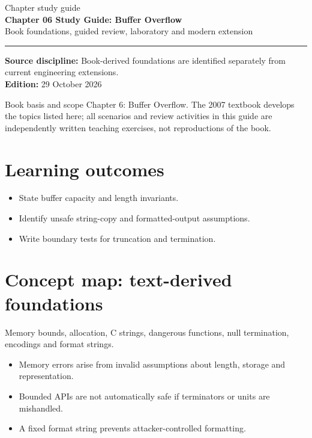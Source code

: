 \documentclass[10pt,letterpaper]{article}
\begin{document}
\hypersetup{pageanchor=false}%
\begin{titlepage}
\vspace*{1.0in}
{\color{bluegray}\Large Chapter study guide}\\[1.0em]
{\color{navy}\Huge\bfseries Chapter 06 Study Guide: Buffer Overflow}\\[0.7em]
{\Large Book foundations, guided review, laboratory and modern extension}\\[2.0em]
\rule{\linewidth}{1.0pt}
\vfill
\textbf{Source discipline:} Book-derived foundations are identified separately from current engineering extensions.\\
\textbf{Edition:} 29 October 2026
\end{titlepage}\hypersetup{pageanchor=true}
\tableofcontents
\clearpage
\begin{focusbox}{Book basis and scope}
Chapter 6: Buffer Overflow. The 2007 textbook develops the topics listed here; all scenarios and review activities in this guide are independently written teaching exercises, not reproductions of the book.\end{focusbox}
\section{Learning outcomes}
\begin{itemize}
\item State buffer capacity and length invariants.
\item Identify unsafe string-copy and formatted-output assumptions.
\item Write boundary tests for truncation and termination.
\end{itemize}

\section{Concept map: text-derived foundations}
Memory bounds, allocation, C strings, dangerous functions, null termination, encodings and format strings.
\begin{itemize}
\item Memory errors arise from invalid assumptions about length, storage and representation.
\item Bounded APIs are not automatically safe if terminators or units are mishandled.
\item A fixed format string prevents attacker-controlled formatting.
\end{itemize}
\end{document}
